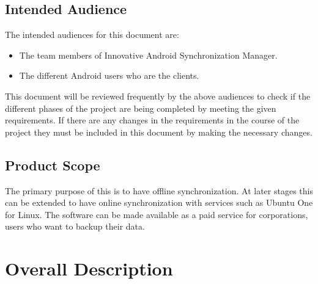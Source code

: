 \subsection{Intended Audience}
The intended audiences for this document are:
\begin{itemize}
 \item The team members of Innovative Android Synchronization Manager.
 \item The different Android users who are the clients.
\end{itemize}

This document will be reviewed frequently by the above audiences to check if the different
phases of the project are being completed by meeting the given requirements. If there are any changes
in the requirements in the course of the project they must be included in this document by making the
necessary changes.
\subsection{Product Scope}
\hspace*{0.82cm}The primary purpose of this is to have offline synchronization. At later stages this can be
extended to have online synchronization with services such as Ubuntu One for Linux. The software
can be made available as a paid service for corporations, users who want to backup their data.
\section{Overall Description}


